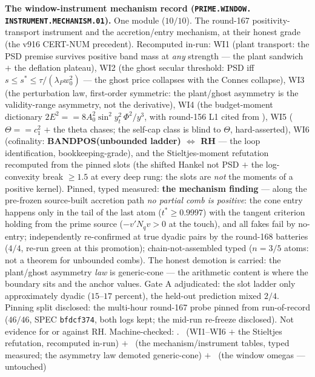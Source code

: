 \documentclass[11pt,a4paper]{article}
\theoremstyle{definition}
\begin{document}
\par\smallskip\noindent\textbf{The window-instrument mechanism
record (\texttt{PRIME.\allowbreak WINDOW.\allowbreak
INSTRUMENT.\allowbreak MECHANISM.01}).}
One module ($10/10$).  The round-167 positivity-transport
instrument and the accretion/entry mechanism, at their honest
grade (the v916 CERT-NUM precedent).  Recomputed in-run: WI1
(plant transport: the PSD premise survives positive band mass at
\emph{any} strength --- the plant sandwich $+$ the deflation
plateau), WI2 (the ghost secular threshold: PSD iff $s \le s^*
\le \tau/(\lambda_P w_0^2)$ --- the ghost price collapses with
the Connes collapse), WI3 (the perturbation law, first-order
symmetric: the plant/ghost asymmetry is the validity-range
asymmetry, not the derivative), WI4 (the budget-moment
dictionary $2E^2 == 8A_0^2\sin^2 y_t^2\,\Phi^2/y^3$, with
round-156 L1 cited from
), WI5 ($\Theta ==
c_1^2$ $+$ the theta chases; the self-cap class is blind to
$\Theta$, hard-asserted), WI6 (cofinality:
\textbf{BANDPOS(unbounded ladder) $\iff$ RH} --- the loop
identification, bookkeeping-grade), and the Stieltjes-moment
refutation recomputed from the pinned slots (the shifted Hankel
not PSD $+$ the log-convexity break $\ge 1.5$ at every deep
rung: the slots are \emph{not} the moments of a positive kernel).
Pinned, typed measured: \textbf{the mechanism finding} --- along
the pre-frozen source-built accretion path \emph{no partial comb
is positive}: the cone entry happens only in the tail of the
last atom ($t^* \ge 0.9997$) with the tangent criterion holding
from the prime source ($-v'N_q v > 0$ at the touch), and all
fakes fail by no-entry; independently re-confirmed at true
dyadic pairs by the round-168 batteries ($4/4$, re-run green at
this promotion); chain-not-assembled typed ($n = 3/5$ atoms:
not a theorem for unbounded combs).  The honest demotion is
carried: the plant/ghost asymmetry \emph{law} is generic-cone
--- the arithmetic content is where the boundary sits and the
anchor values.  Gate A adjudicated: the slot ladder only
approximately dyadic ($15$--$17$ percent), the held-out
prediction mixed $2/4$.  Pinning split disclosed: the multi-hour
round-167 probe pinned from run-of-record ($46/46$, SPEC
\texttt{bfdcf374}, both logs kept; the mid-run re-freeze
disclosed).  Not evidence for or against RH.
Machine-checked:
.
\mE\ (WI1--WI6 $+$ the Stieltjes refutation, recomputed in-run)
$+$ \mC\ (the mechanism/instrument tables, typed measured; the
asymmetry law demoted generic-cone) $+$ \mO\ (the window omegas
--- untouched)
\par\smallskip
\end{document}

